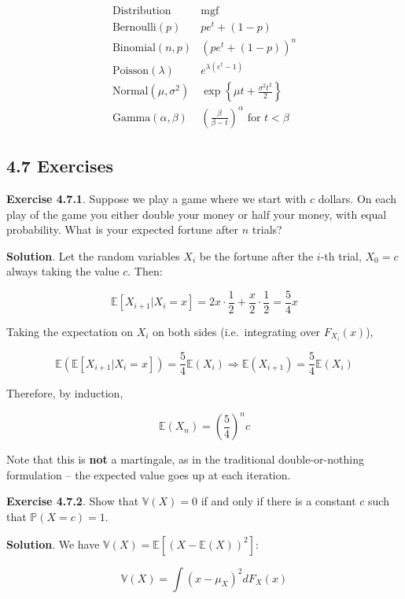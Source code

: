 \[
\begin{array}{ll}
\text{Distribution} & \text{mgf} \\
\hline
\text{Bernoulli}(p)   & pe^t + (1 - p)         \\
\text{Binomial}(n, p) & (pe^t + (1 - p))^n     \\
\text{Poisson}(\lambda) & e^{\lambda(e^t - 1)} \\
\text{Normal}(\mu, \sigma^2) & \exp\left\{\mu t + \frac{\sigma^2 t^2}{2} \right\} \\
\text{Gamma}(\alpha, \beta) & \left( \frac{\beta}{\beta - t} \right)^\alpha \text{ for } t < \beta
\end{array}
\]

\subsection{4.7 Exercises}\label{exercises}

\textbf{Exercise 4.7.1}. Suppose we play a game where we start with
\(c\) dollars. On each play of the game you either double your money or
half your money, with equal probability. What is your expected fortune
after \(n\) trials?

\textbf{Solution}. Let the random variables \(X_i\) be the fortune after
the \(i\)-th trial, \(X_0 = c\) always taking the value \(c\). Then:

\[ \mathbb{E}[X_{i + 1} | X_i = x] = 2x \cdot \frac{1}{2} + \frac{x}{2} \cdot \frac{1}{2} = \frac{5}{4}x \]

Taking the expectation on \(X_i\) on both sides (i.e.~integrating over
\(F_{X_i}(x)\)),

\[ \mathbb{E}(\mathbb{E}[X_{i + 1} | X_i = x]) = \frac{5}{4} \mathbb{E}(X_i) \Longrightarrow \mathbb{E}(X_{i+1}) = \frac{5}{4}  \mathbb{E}(X_i)\]

Therefore, by induction,

\[ \mathbb{E}(X_n) = \left(\frac{5}{4}\right)^n c \]

Note that this is \textbf{not} a martingale, as in the traditional
double-or-nothing formulation -- the expected value goes up at each
iteration.

\textbf{Exercise 4.7.2}. Show that \(\mathbb{V}(X) = 0\) if and only if
there is a constant \(c\) such that \(\mathbb{P}(X = c) = 1\).

\textbf{Solution}. We have
\(\mathbb{V}(X) = \mathbb{E}[(X - \mathbb{E}(X))^2]\):

\[ \mathbb{V}(X) = \int (x - \mu_X)^2 dF_X(x) \]

